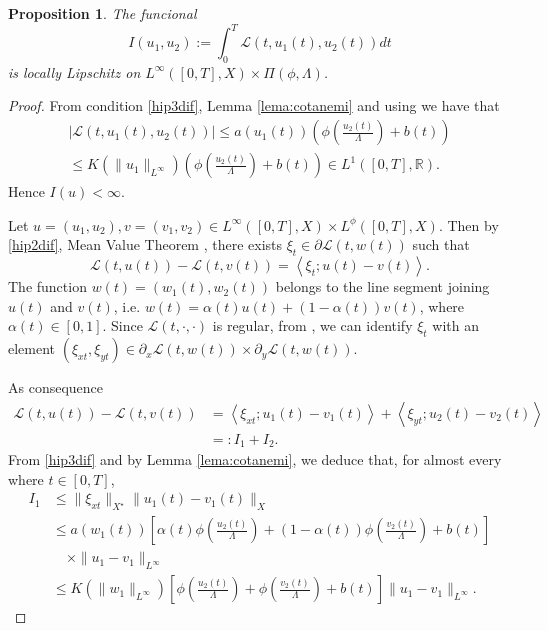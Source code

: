 \documentclass[twoside]{article}
\theoremstyle{definition}
\theoremstyle{plain}
\newtheorem{Propos}[definition]{Proposition}
\theoremstyle{remark}
\begin{document}
\begin{Propos} The funcional
\[ I(u_1,u_2):= \int_0^T{\mathcal{L}(t,u_1(t),u_2(t)) dt}\] is locally Lipschitz on $L^\infty([0,T],X)\times\Pi(\phi, \Lambda)$.
\end{Propos}
\begin{proof}
From condition \ref{hip3dif}, Lemma \ref{lema:cotanemi} and using \cite[Th. 5.1]{orliczvectorial2005} we have that 
\begin{multline*}
 |\mathcal{L}(t,u_1(t),u_2(t))| \leq a(u_1(t)) \left(\phi \left(\frac{u_2(t)}{\Lambda}\right)+ b(t)\right)\\
 \leq K(\|u_1\|_{L^\infty})\left(\phi \left(\frac{u_2(t)}{\Lambda}\right)+ b(t)\right) \in L^1([0,T],\mathbb{R}).
\end{multline*}
Hence $I(u)<\infty$.

Let $u=(u_1,u_2), v=(v_1,v_2) \in L^\infty([0,T],X)\times L^\phi ([0,T],X)$. Then by \ref{hip2dif}, Mean Value Theorem \cite[Th. 10.17]{clarke2013functional}, there exists $\xi_t \in \partial \mathcal{L}(t,w(t))$ such that
\[ \mathcal{L}(t,u(t))-\mathcal{L}(t,v(t)) = \left< \xi_t ; u(t)-v(t)\right>.\]
 The function  $w(t)=(w_1(t),w_2(t))$ belongs to the line segment joining $u(t)$ and $v(t)$, i.e.  $w(t)=\alpha(t)u(t)+(1-\alpha(t))v(t)$, where $\alpha(t) \in [0,1]$.
Since  $\mathcal{L}(t,\cdot,\cdot)$ is regular,  from \cite[Prop. 2.3.15]{clarke1990optimization}, we can identify  $\xi_t$ with an element $(\xi_{xt},\xi_{yt}) \in \partial_{x} \mathcal{L}(t,w(t))\times \partial_{y} \mathcal{L}(t,w(t))  $.

As consequence
\begin{equation}\label{ecua:acotac}
    \begin{split}
	\mathcal{L}(t,u(t))-\mathcal{L}(t,v(t)) &= \left< \xi_{xt}; u_1(t)-v_1(t)\right> +\left< \xi_{yt}; u_2(t)-v_2(t)\right>\\
	&=:I_1+I_2.
	\end{split}
\end{equation}
From \ref{hip3dif} and by Lemma \ref{lema:cotanemi}, we deduce that, for almost every where $ t\in[0,T]$,
\begin{equation}\label{ecua:sum1}
 \begin{split}
   I_1  & \leq  \|\xi_{xt}\|_{X^\star} \|u_1(t)-v_1(t)\|_X \\
&\leq  a(w_1(t)) \left [\alpha(t) \phi\left( \frac{u_2(t)}{\Lambda} \right)+(1-\alpha(t))\phi\left( \frac{v_2(t)}{\Lambda}\right)+b(t)\right]\\
&\quad  \times \|u_1-v_1\|_{L^\infty}\\
 &\leq  K(\|w_1\|_{L^\infty}) \left [\phi\left( \frac{u_2(t)}{\Lambda} \right)+\phi\left( \frac{v_2(t)}{\Lambda} \right) + b(t)\right]\|u_1-v_1\|_{L^\infty }.
 \end{split}
\end{equation}





\end{proof}
\end{document}
